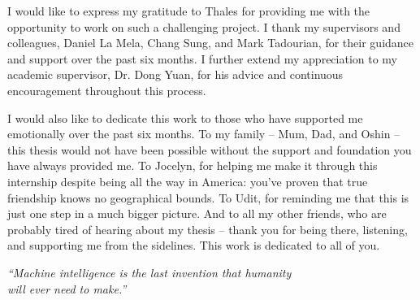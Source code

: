 I would like to express my gratitude to Thales for providing me with the opportunity to work on such a challenging project. I thank my supervisors and colleagues, Daniel La Mela, Chang Sung, and Mark Tadourian, for their guidance and support over the past six months. I further extend my appreciation to my academic supervisor, Dr. Dong Yuan, for his advice and continuous encouragement throughout this process.

\vspace{1em}

\noindent I would also like to dedicate this work to those who have supported me emotionally over the past six months. To my family -- Mum, Dad, and Oshin -- this thesis would not have been possible without the support and foundation you have always provided me. To Jocelyn, for helping me make it through this internship despite being all the way in America: you've proven that true friendship knows no geographical bounds. To Udit, for reminding me that this is just one step in a much bigger picture. And to all my other friends, who are probably tired of hearing about my thesis -- thank you for being there, listening, and supporting me from the sidelines. This work is dedicated to all of you.

\clearpage\null\thispagestyle{empty}
\clearpage\thispagestyle{empty}

\vspace*{8cm} 

\begin{center}
    \begin{minipage}{0.8\textwidth}
        \begin{flushright}
            \itshape
            ``Machine intelligence is the last invention that humanity\\
            will ever need to make.''
        \end{flushright}
        \vspace{0.3cm}
        \begin{flushright}
        \end{flushright}
    \end{minipage}
\end{center}

\newpage\thispagestyle{empty}
\tableofcontents

\newpage\thispagestyle{empty}
\listoffigures{}

\newpage\thispagestyle{empty}
\listoftables{}

\newpage\thispagestyle{empty}

\printglossary[type=\acronymtype, title={List of Abbreviations}]
